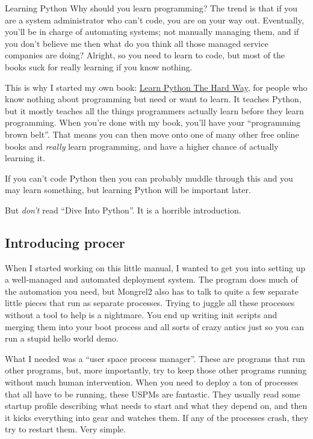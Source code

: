 \begin{aside}{Learning Python}
Why should you learn programming?  The trend is that if you are a system administrator
who can't code, you are on your way out.  Eventually, you'll be in charge of automating
systems; not manually managing them, and if you don't believe me then what do you think all
those managed service companies are doing?  Alright, so you need to learn to code, but
most of the books suck for really learning if you know nothing.

This is why I started my own book: \href{http://learnpythonthehardway.org}{Learn
Python The Hard Way}, for people who know nothing about programming but need or
want to learn.  It teaches Python, but it mostly teaches all the things
programmers actually learn before they learn programming.  When you're done
with my book, you'll have your ``programming brown belt''.  That means you can
then move onto one of many other free online books and \emph{really} learn
programming, and have a higher chance of actually learning it.

If you can't code Python then you can probably muddle through this and you may
learn something, but learning Python will be important later.

But \emph{don't} read ``Dive Into Python''. It is a horrible introduction.
\end{aside}

\subsection{Introducing procer}

When I started working on this little manual, I wanted to get you into setting up
a well-managed and automated deployment system.  The  program does
much of the automation you need, but Mongrel2 also has to talk to quite a few
separate little pieces that run as separate processes.  Trying to juggle all these
processes without a tool to help is a nightmare.  You end up writing init scripts
and merging them into your boot process and all sorts of crazy antics just so you
can run a stupid hello world demo.

What I needed was a ``user space process manager''.  These are programs that run other
programs, but, more importantly, try to keep those other programs running without much
human intervention.  When you need to deploy a ton of processes that all have to
be running, these USPMs are fantastic.  They usually read some startup profile describing
what needs to start and what they depend on, and then it kicks everything into gear
and watches them.  If any of the processes crash, they try to restart them.  Very simple.

